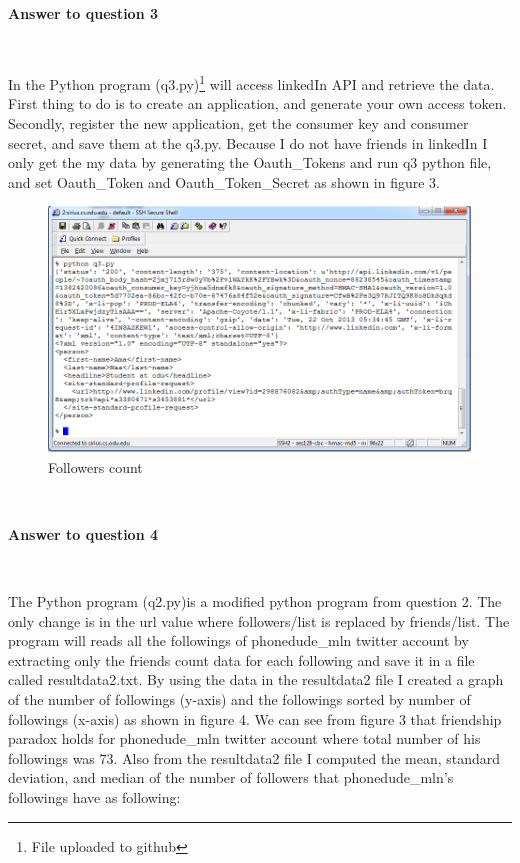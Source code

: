 \documentclass[a4paper,12pt]{article}
\begin{document}



\pagebreak

\textbf{Answer to question 3}\par
$\:$

\par
In the Python program (q3.py)\footnote{File uploaded to github} will access linkedIn API and retrieve the data. First thing to do is to create an application, and generate your own access token. Secondly, register the new application, get the consumer key and consumer secret, and save them at the q3.py\footnotemark[2]. Because I do not have friends in linkedIn I only get the my data by generating the Oauth\_Tokens and run q3 python file, and set Oauth\_Token and Oauth\_Token\_Secret as shown in figure 3.
\par

\begin{figure}
	\center
		\includegraphics[width=\linewidth]{MyLinkedIn.png} 
	\caption{Followers count}
\end{figure}

$\:$

\textbf{Answer to question 4}\par
$\:$

\par
The Python program (q2.py)\footnotemark[2] is a modified python program from question 2. The only change is in the url value where followers/list is replaced by friends/list. The program will reads all the followings of phonedude\_mln twitter account by extracting only the friends count data for each following and save it in a file called resultdata2.txt\footnotemark[2]. By using the data in the resultdata2 file I created a graph of the number of followings (y-axis) and the followings sorted by number of followings (x-axis) as shown in figure 4. We can see from figure 3 that friendship paradox holds for phonedude\_mln twitter account where total number of his followings was 73. Also from the resultdata2 file I computed the mean, standard deviation, and median of the number of followers that phonedude\_mln's followings have as following:
\end{document}
